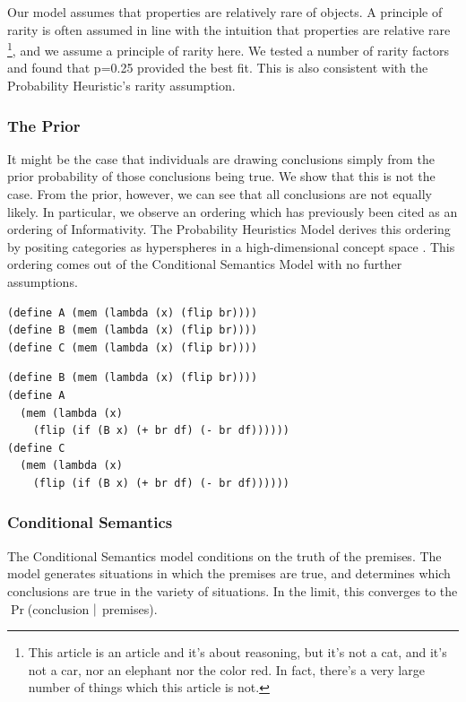 \documentclass[10pt,letterpaper]{article}
\begin{document}

Our model assumes that properties are relatively rare of objects.  A principle of rarity is often assumed in line with the intuition that properties are relative rare \footnote{This article is an article and it's about reasoning, but it's not a cat, and it's not a car, nor an elephant nor the color red. In fact, there's a very large number of things which this article is not.}, and we assume a principle of rarity here. We tested a number of rarity factors and found that p=0.25 provided the best fit. This is also consistent with the Probability Heuristic's rarity assumption. 


\subsubsection{The Prior}
It might be the case that individuals are drawing conclusions simply from the prior probability of those conclusions being true. We show that this is not the case. From the prior, however, we can see that all conclusions are not equally likely. In particular, we observe an ordering which has previously been cited as an ordering of Informativity. The Probability Heuristics Model derives this ordering by positing categories as hyperspheres in a high-dimensional concept space \cite{Chater1999}. This ordering comes out of the Conditional Semantics Model with no further assumptions.

\begin{lstlisting}
(define A (mem (lambda (x) (flip br))))
(define B (mem (lambda (x) (flip br))))
(define C (mem (lambda (x) (flip br))))
\end{lstlisting}

\begin{lstlisting}
(define B (mem (lambda (x) (flip br))))
(define A 
  (mem (lambda (x) 
    (flip (if (B x) (+ br df) (- br df))))))
(define C 
  (mem (lambda (x) 
    (flip (if (B x) (+ br df) (- br df))))))
\end{lstlisting}


\subsubsection{Conditional Semantics}

The Conditional Semantics model conditions on the truth of the premises. The model generates situations in which the premises are true, and determines which conclusions are true in the variety of situations. In the limit, this converges to the $\Pr$(conclusion $\arrowvert$ premises). 
\end{document}
